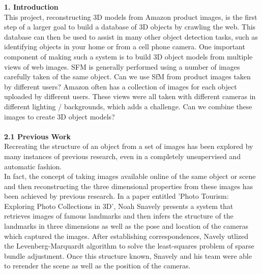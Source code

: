 \documentclass[12pt]{article}
\begin{document}
\begin{multicols}{2}
{\noindent \large \textbf{1. Introduction}}\\
This project, reconstructing 3D models from Amazon product images, is the first step of a larger goal to build a database of 3D objects by crawling the web.  This database can then be used to assist in many other object detection tasks, such as identifying objects in your home or from a cell phone camera.  One important component of making such a system is to build 3D object models from multiple views of web images. SFM is generally performed using a number of images carefully taken of the same object.  Can we use SfM from product images taken by different users?  Amazon often has a collection of images for each object uploaded by different users.  These views were all taken with different cameras in different lighting / backgrounds, which adds a challenge.  Can we combine these images to create 3D object models?
\\\\
{\large \textbf{2.1 Previous Work}}\\
Recreating the structure of an object from a set of images has been explored by many instances of previous research, even in a completely unsupervised and automatic fashion. \\
\indent In fact, the concept of taking images available online of the same object or scene and then reconstructing the three dimensional properties from these images has been achieved by previous research. In a paper entitled 'Photo Tourism: Exploring Photo Collections in 3D', Noah Snavely presents a system that retrieves images of famous landmarks and then infers the structure of the landmarks in three dimensions as well as the pose and location of the cameras which captured the images. After establishing correspondences, Navely utlized the Levenberg-Marquardt algorithm to solve the least-squares problem of sparse bundle adjustment. Once this structure known, Snavely and his team were able to rerender the scene as well as the position of the cameras. \\

\end{multicols}
\end{document}
